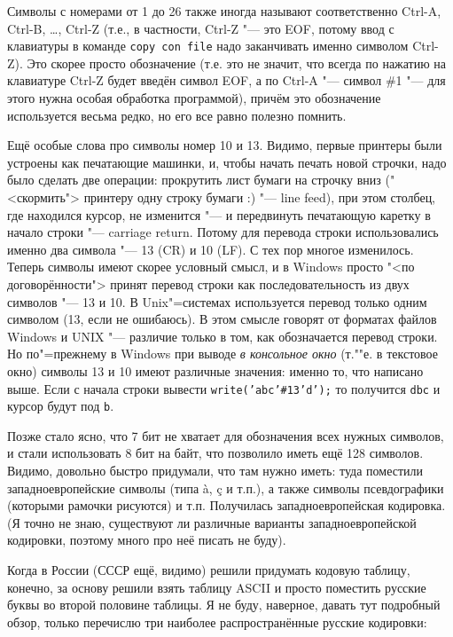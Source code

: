 Символы с номерами от 1 до 26 также иногда называют соответственно Ctrl-A, Ctrl-B, \dots, Ctrl-Z (т.е.,
в частности, Ctrl-Z "--- это EOF, потому ввод с клавиатуры в команде \texttt{copy con file} надо заканчивать именно
символом Ctrl-Z).  Это скорее просто обозначение (т.е. это не значит, что всегда по нажатию на клавиатуре Ctrl-Z будет введён 
символ EOF, а по Ctrl-A "--- символ \#1 "--- для этого нужна особая обработка программой), причём это обозначение используется весьма редко, но его все
равно полезно помнить.

Ещё особые слова про символы номер 10 и 13. Видимо, первые принтеры были устроены как печатающие машинки, и, чтобы 
начать печать новой строчки, надо было сделать две операции: прокрутить лист бумаги на строчку вниз ("<скормить">
принтеру одну строку бумаги :) "--- line feed), при этом столбец, где находился курсор, не изменится "--- и 
передвинуть печатающую каретку в начало строки "--- carriage return. Потому для перевода строки использовались именно 
два символа "--- 13 (CR) и 10 (LF). С тех пор многое изменилось. Теперь символы имеют скорее условный смысл, и в Windows
просто "<по договорённости"> принят перевод строки как последовательность из двух символов "--- 13 и 10. В Unix"=системах используется перевод 
только одним символом (13, если не ошибаюсь). В этом смысле говорят от форматах файлов Windows и UNIX "--- различие только
в том, как обозначается перевод строки. Но по"=прежнему в Windows при выводе 
\textit{в консольное окно} (т.""е. в текстовое окно) символы 13 и 10 имеют 
различные значения: именно то, что написано выше. Если с начала строки вывести 
\texttt{write('abc'\#13'd');} то получится \texttt{dbc} и курсор будут под \texttt{b}.

Позже стало ясно, что 7 бит не хватает для обозначения всех нужных символов, и стали использовать 8 бит на байт, что позволило иметь ещё 128 символов.
Видимо, довольно быстро придумали, 
что там нужно иметь: туда поместили западноевропейские символы (типа \` a, \c c и т.п.), а также символы псевдографики
(которыми рамочки рисуются) и т.п. Получилась западноевропейская кодировка. (Я точно не знаю, существуют ли различные варианты 
западноевропейской кодировки, поэтому много про неё писать не буду).

Когда в России (СССР ещё, видимо) решили придумать кодовую таблицу, конечно, за основу решили взять таблицу ASCII и просто
поместить русские буквы во второй половине таблицы. Я не буду, наверное, давать тут подробный обзор, только перечислю 
три наиболее распространённые русские кодировки:

